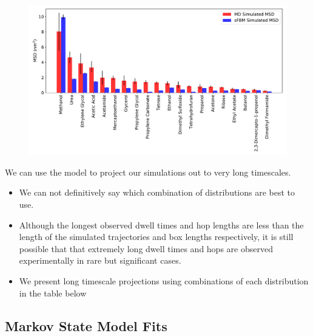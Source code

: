 \documentclass{article}
\begin{document}
  \begin{figure}
  \centering
  \includegraphics[width=\textwidth]{all_emsds.pdf}
  \caption{}\label{fig:all_msds}
  \end{figure}
  
  \noindent We can use the model to project our simulations out to very long timescales.
  \begin{itemize}
    \item We can not definitively say which combination of distributions are best to use.
    \item Although the longest observed dwell times and hop lengths are less than
    the length of the simulated trajectories and box lengths respectively, it is still possible
    that that extremely long dwell times and hops are observed experimentally in rare but
    significant cases.
    \item We present long timescale projections using combinations of each distribution in the
    table below
  \end{itemize}


  \subsection{Markov State Model Fits}\label{section:msm_results}
  
\end{document}

